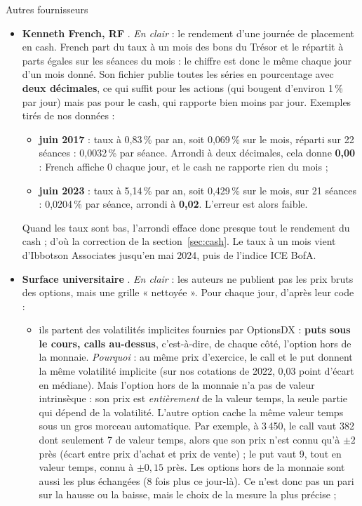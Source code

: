 \documentclass[10pt,a4paper]{article}
\begin{document}
\begin{fournisseur}{Autres fournisseurs}
\begin{itemize}
\item \textbf{Kenneth French, RF} \cite{french}. \emph{En clair} : le rendement d'une journée de placement en cash. French part du taux à un mois des bons du Trésor et le répartit à parts égales sur les séances du mois : le chiffre est donc le même chaque jour d'un mois donné. Son fichier publie toutes les séries en pourcentage avec \textbf{deux décimales}, ce qui suffit pour les actions (qui bougent d'environ 1\,\% par jour) mais pas pour le cash, qui rapporte bien moins par jour. Exemples tirés de nos données :
  \begin{itemize}
  \item \textbf{juin 2017} : taux à 0,83\,\% par an, soit 0,069\,\% sur le mois, réparti sur 22 séances : 0,0032\,\% par séance. Arrondi à deux décimales, cela donne \textbf{0,00} : French affiche 0 chaque jour, et le cash ne rapporte rien du mois ;
  \item \textbf{juin 2023} : taux à 5,14\,\% par an, soit 0,429\,\% sur le mois, sur 21 séances : 0,0204\,\% par séance, arrondi à \textbf{0,02}. L'erreur est alors faible.
  \end{itemize}
  Quand les taux sont bas, l'arrondi efface donc presque tout le rendement du cash ; d'où la correction de la section~\ref{sec:cash}. Le taux à un mois vient d'Ibbotson Associates jusqu'en mai 2024, puis de l'indice ICE BofA.
\item \textbf{Surface universitaire} \cite{dusbaja}. \emph{En clair} : les auteurs ne publient pas les prix bruts des options, mais une grille « nettoyée ». Pour chaque jour, d'après leur code :
  \begin{itemize}
  \item ils partent des volatilités implicites fournies par OptionsDX : \textbf{puts sous le cours, calls au-dessus}, c'est-à-dire, de chaque côté, l'option hors de la monnaie. \emph{Pourquoi} : au même prix d'exercice, le call et le put donnent la même volatilité implicite (sur nos cotations de 2022, 0,03 point d'écart en médiane). Mais l'option hors de la monnaie n'a pas de valeur intrinsèque : son prix est \emph{entièrement} de la valeur temps, la seule partie qui dépend de la volatilité. L'autre option cache la même valeur temps sous un gros morceau automatique. Par exemple, à 3\,450, le call vaut 382 dont seulement 7 de valeur temps, alors que son prix n'est connu qu'à $\pm2$ près (écart entre prix d'achat et prix de vente) ; le put vaut 9, tout en valeur temps, connu à $\pm0{,}15$ près. Les options hors de la monnaie sont aussi les plus échangées (8 fois plus ce jour-là). Ce n'est donc pas un pari sur la hausse ou la baisse, mais le choix de la mesure la plus précise ;

\end{itemize}
\end{itemize}
\end{fournisseur}
\end{document}
